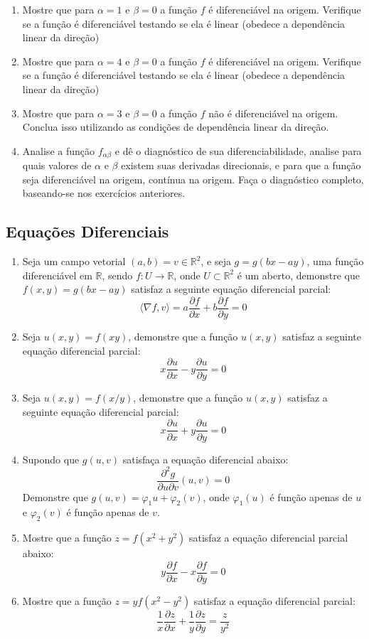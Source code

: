 \begin{enumerate}
	\item Mostre que para $\alpha = 1$ e $\beta = 0$ a função $f$ é diferenciável na origem. Verifique se a função é diferenciável testando se ela é linear (obedece a dependência linear da direção)
	\item Mostre que para $\alpha = 4$ e $\beta = 0$ a função $f$ é diferenciável na origem. Verifique se a função é diferenciável testando se ela é linear (obedece a dependência linear da direção)
	\item Mostre que para $\alpha = 3$ e $\beta = 0$ a função $f$ não é diferenciável	na origem. Conclua isso utilizando as condições de dependência linear da direção.
	\item Analise a função $f_{\alpha\beta}$ e dê o diagnóstico de sua diferenciabilidade, analise para quais valores de $\alpha$ e $\beta$ existem suas derivadas direcionais, e para que a função seja diferenciável na origem, contínua na origem. Faça o diagnóstico completo, baseando-se nos exercícios anteriores.
\end{enumerate}




\subsection{Equações Diferenciais}

\begin{enumerate}
	\item Seja um campo vetorial $(a,b) = v\in \mathbb{R}^2$, 
	e seja $g = g(bx - ay)$, uma função diferenciável em 
	$\mathbb{R}$, sendo $f:U\to\mathbb{R}$, onde 
	$U\subset\mathbb{R}^2$ é um aberto, demonstre que 
	$f(x,y) = g(bx - ay)$ satisfaz a seguinte equação 
	diferencial parcial:
	\[
	\langle \nabla f , v \rangle 
	= a\frac{\partial f}{\partial x} 
	+ b\frac{\partial f}{\partial y} = 0
	\]
	\item Seja $u(x,y) = f(xy)$, demonstre que a função 
	$u(x,y)$ satisfaz a seguinte equação diferencial parcial:
	\[
	x \frac{\partial u}{\partial x} 
	- y \frac{\partial u}{\partial y} 
	= 0
	\]
	\item Seja $u(x,y) = f(x/y)$, demonstre que a função 
	$u(x,y)$ satisfaz a seguinte equação diferencial parcial:
	\[
	x \frac{\partial u}{\partial x} 
	+ y \frac{\partial u}{\partial y} = 0
	\]
	\item Supondo que $g(u,v)$ satisfaça a equação diferencial abaixo:
	\[
	\frac{\partial^2 g}{\partial u \partial v} (u,v) = 0
	\]
	Demonstre que $g(u,v) = \varphi_1{u} + \varphi_2(v)$, onde 
	$\varphi_1(u)$ é função apenas de $u$ e $\varphi_2(v)$ 
	é função apenas de $v$.
	 \item Mostre que a função $z = f(x^2+y^2)$ satisfaz a 
	 equação diferencial parcial abaixo:
	 \[
	 y \frac{\partial f}{\partial x} 
	 - x \frac{\partial f}{\partial y} = 0
	 \]
	 \item Mostre que a função $z = y f(x^2-y^2)$ satisfaz a 
	 equação diferencial parcial:
	 \[
	 \frac{1}{x}\frac{\partial z}{\partial x} 
	 + \frac{1}{y}\frac{\partial z}{\partial y} 
	 = \frac{z}{y^2}
	 \]
\end{enumerate}
